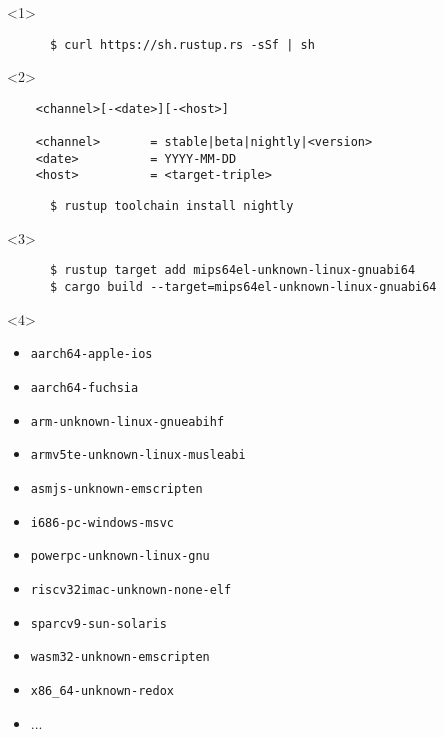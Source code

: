 \begin{frame}[fragile]{\insertsubsection}
  \begin{onlyenv}<1>
    \begin{verbatim}
      $ curl https://sh.rustup.rs -sSf | sh
    \end{verbatim}
  \end{onlyenv}

  \begin{onlyenv}<2>
    \begin{verbatim}
    <channel>[-<date>][-<host>]

    <channel>       = stable|beta|nightly|<version>
    <date>          = YYYY-MM-DD
    <host>          = <target-triple>
  \end{verbatim}

  \begin{verbatim}
      $ rustup toolchain install nightly
    \end{verbatim}
  \end{onlyenv}

  \begin{onlyenv}<3>
    \begin{verbatim}
      $ rustup target add mips64el-unknown-linux-gnuabi64
      $ cargo build --target=mips64el-unknown-linux-gnuabi64
    \end{verbatim}
  \end{onlyenv}

  \begin{onlyenv}<4>
    \begin{itemize}
    \item \texttt{aarch64-apple-ios}
    \item \texttt{aarch64-fuchsia}
    \item \texttt{arm-unknown-linux-gnueabihf}
    \item \texttt{armv5te-unknown-linux-musleabi}
    \item \texttt{asmjs-unknown-emscripten}
    \item \texttt{i686-pc-windows-msvc}
    \item \texttt{powerpc-unknown-linux-gnu}
    \item \texttt{riscv32imac-unknown-none-elf}
    \item \texttt{sparcv9-sun-solaris}
    \item \texttt{wasm32-unknown-emscripten}
    \item \texttt{x86\_64-unknown-redox}
    \item ...
    \end{itemize}
  \end{onlyenv}


\end{frame}
